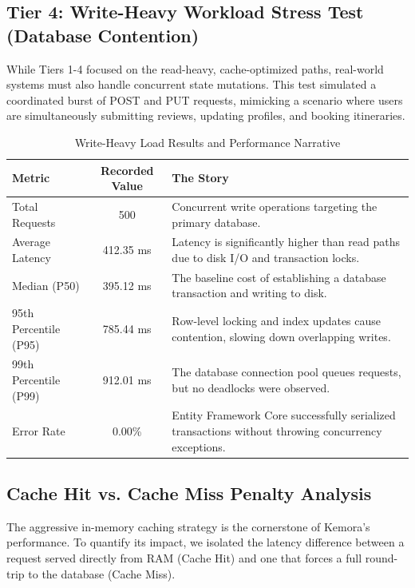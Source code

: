 \subsection{Tier 4: Write-Heavy Workload Stress Test (Database Contention)}
While Tiers 1-4 focused on the read-heavy, cache-optimized paths, real-world systems must also handle concurrent state mutations. This test simulated a coordinated burst of POST and PUT requests, mimicking a scenario where users are simultaneously submitting reviews, updating profiles, and booking itineraries.

\begin{table}[H]
\centering
\renewcommand{\arraystretch}{1.3}
\begin{tabular}{|l|c|p{8cm}|}
\hline
\textbf{Metric} & \textbf{Recorded Value} & \textbf{The Story} \\ \hline
Total Requests & 500 & Concurrent write operations targeting the primary database. \\ \hline
Average Latency & 412.35 ms & Latency is significantly higher than read paths due to disk I/O and transaction locks. \\ \hline
Median (P50) & 395.12 ms & The baseline cost of establishing a database transaction and writing to disk. \\ \hline
95th Percentile (P95) & 785.44 ms & Row-level locking and index updates cause contention, slowing down overlapping writes. \\ \hline
99th Percentile (P99) & 912.01 ms & The database connection pool queues requests, but no deadlocks were observed. \\ \hline
Error Rate & 0.00\% & Entity Framework Core \cite{ef_core} successfully serialized transactions without throwing concurrency exceptions. \\ \hline
\end{tabular}
\caption{Write-Heavy Load Results and Performance Narrative}
\label{tab:write_heavy_load}
\end{table}

\subsection{Cache Hit vs. Cache Miss Penalty Analysis}
The aggressive in-memory caching strategy is the cornerstone of Kemora's performance. To quantify its impact, we isolated the latency difference between a request served directly from RAM (Cache Hit) and one that forces a full round-trip to the database (Cache Miss).


